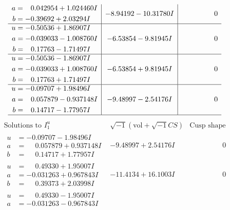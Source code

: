 \documentclass[1p]{elsarticle_modified}
\theoremstyle{definition}
\newcommand{\I}{\sqrt{-1}}
\begin{document}
$$\begin{array}{c|c|c}
\begin{aligned}
a &= \phantom{-}0.042954 + 1.024460 I \\
b &= -0.39692 + 2.03294 I\end{aligned}
 & -8.94192 - 10.31780 I & \phantom{-0.000000 } 0 \\ \hline\begin{aligned}
u &= -0.50536 + 1.86907 I \\
a &= -0.039033 - 1.008760 I \\
b &= \phantom{-}0.17763 - 1.71497 I\end{aligned}
 & -6.53854 - 9.81945 I & \phantom{-0.000000 } 0 \\ \hline\begin{aligned}
u &= -0.50536 - 1.86907 I \\
a &= -0.039033 + 1.008760 I \\
b &= \phantom{-}0.17763 + 1.71497 I\end{aligned}
 & -6.53854 + 9.81945 I & \phantom{-0.000000 } 0 \\ \hline\begin{aligned}
u &= -0.09707 + 1.98496 I \\
a &= \phantom{-}0.057879 - 0.937148 I \\
b &= \phantom{-}0.14717 - 1.77957 I\end{aligned}
 & -9.48997 - 2.54176 I & \phantom{-0.000000 } 0\\
 \hline 
 \end{array}$$\newpage$$\begin{array}{c|c|c}  
\text{Solutions to }I^u_{1}& \I (\text{vol} + \sqrt{-1}CS) & \text{Cusp shape}\\
 \hline 
\begin{aligned}
u &= -0.09707 - 1.98496 I \\
a &= \phantom{-}0.057879 + 0.937148 I \\
b &= \phantom{-}0.14717 + 1.77957 I\end{aligned}
 & -9.48997 + 2.54176 I & \phantom{-0.000000 } 0 \\ \hline\begin{aligned}
u &= \phantom{-}0.49330 + 1.95007 I \\
a &= -0.031263 + 0.967843 I \\
b &= \phantom{-}0.39373 + 2.03998 I\end{aligned}
 & -11.4134 + 16.1003 I & \phantom{-0.000000 } 0 \\ \hline\begin{aligned}
u &= \phantom{-}0.49330 - 1.95007 I \\
a &= -0.031263 - 0.967843 I \\

\end{aligned}
\end{array}$$
\end{document}
